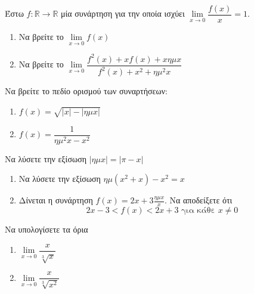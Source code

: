 \documentclass{presentation}
\begin{document}
\begin{askisi}
  Έστω $f:\mathbb{R}\to\mathbb{R}$ μία συνάρτηση για την οποία ισχύει $\lim\limits_{x \to 0}{ \dfrac{f(x)}{x} }=1$.
  \begin{enumerate}
    \item Να βρείτε το $\lim\limits_{x \to 0}{f(x)}$ \pause
    \item Να βρείτε το $\lim\limits_{x \to 0}{\dfrac{f^2(x)+xf(x)+xημx}{f^2(x)+x^2+ημ^2x}}$
  \end{enumerate}

\end{askisi}

\begin{askisi}
  Να βρείτε το πεδίο ορισμού των συναρτήσεων:
  \begin{enumerate}
    \item $f(x)=\sqrt{|x|-|ημx|}$ \pause
    \item $f(x)=\dfrac{1}{ημ^2x-x^2}$
  \end{enumerate}

\end{askisi}

\begin{askisi}
  Να λύσετε την εξίσωση $|ημx|=|π-x|$

\end{askisi}

\begin{askisi}
  \begin{enumerate}
    \item Να λύσετε την εξίσωση $ημ(x^2+x)-x^2=x$ \pause
    \item Δίνεται η συνάρτηση $f(x)=2x+3\frac{ημx}{x}$. Να αποδείξετε ότι
          $$2x-3<f(x)<2x+3 \text{ για κάθε } x\ne 0$$
  \end{enumerate}

\end{askisi}

\begin{askisi}
  Να υπολογίσετε τα όρια
  \begin{enumerate}
    \item $\lim\limits_{x \to 0}{ \dfrac{x}{\sqrt[3]{x}} }$ \pause
    \item $\lim\limits_{x \to 0}{ \dfrac{x}{\sqrt[3]{x^2}} }$
  \end{enumerate}

\end{askisi}

\moodle
\end{document}
